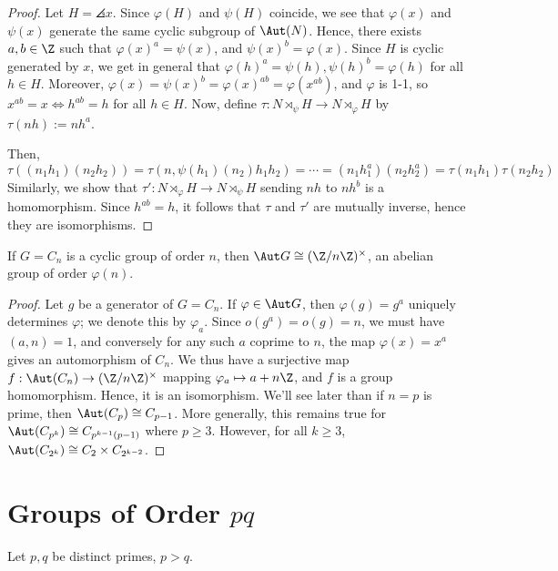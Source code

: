 \begin{proof}
    Let $H = \angles{x}$. Since $\varphi (H)$ and $\psi(H)$ coincide, we see that $\varphi(x)$ and $\psi(x)$ generate the same cyclic subgroup of $\Aut (N)$. Hence, there exists $a,b\in \Z$ such that $\varphi (x)^a = \psi(x)$, and $\psi(x)^b = \varphi(x)$. Since $H$ is cyclic generated by $x$, we get in general that $\varphi(h)^a=\psi (h),\psi(h)^b=\varphi(h)$ for all $h \in H$. Moreover, $\varphi(x)=\psi(x)^b=\varphi(x)^{ab}=\varphi(x^{ab})$, and $\varphi$ is 1-1, so $x^{ab}=x \iff h^{ab}=h$ for all $h \in H$. Now, define $\tau :N \rtimes _\psi H \to N \rtimes _\varphi H$ by $\tau (nh) := nh^a$.

    Then,
    $$\tau((n_1h_1)(n_2h_2))=\tau (n,\psi(h_1)(n_2)h_1h_2)=\cdots =(n_1h_1^a)(n_2h_2^a)=\tau(n_1h_1)\tau(n_2h_2)$$
    Similarly, we show that $\tau ' : N \rtimes _\varphi H \to N \rtimes_\psi H$ sending $nh$ to $nh^b$ is a homomorphism. Since $h^{ab}=h$, it follows that $\tau$ and $\tau '$ are mutually inverse, hence they are isomorphisms.
\end{proof}

\begin{prop}
    If $G = C_n$ is a cyclic group of order $n$, then $\Aut G \cong (\Z/n\Z)^\times$, an abelian group of order $\varphi(n)$.
\end{prop}

\begin{proof}
    Let $g$ be a generator of $G=C_n$. If $\varphi \in \Aut G$, then $\varphi(g)=g^a$ uniquely determines $\varphi$; we denote this by $\varphi_a$. Since $o(g^a)=o(g)=n$, we must have $(a,n) = 1$, and conversely for any such $a$ coprime to $n$, the map $\varphi(x)=x^a$ gives an automorphism of $C_n$. We thus have a surjective map $f:\Aut (C_n) \to (\Z/n\Z)^\times$ mapping $\varphi_a \mapsto a+n\Z$, and $f$ is a group homomorphism. Hence, it is an isomorphism. We'll see later than if $n=p$ is prime, then $\Aut (C_p) \cong C_{p-1}$. More generally, this remains true for $\Aut(C_{p^k})\cong C_{p^{k-1}(p-1)}$ where $p \geq 3$. However, for all $k \geq 3$, $\Aut(C_{2^k}) \cong C_2 \times C_{2^{k-2}}$.
\end{proof}

\section{\texorpdfstring{Groups of Order $pq$}{Groups of Order pq}}

Let $p,q$ be distinct primes, $p>q$.

